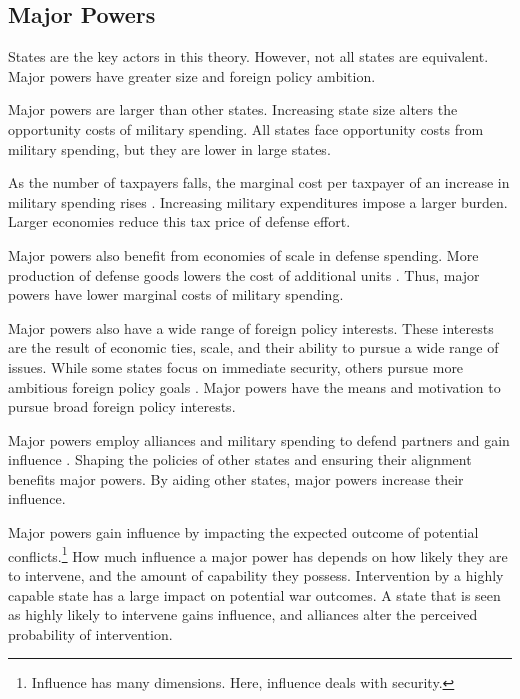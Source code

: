\documentclass[12pt]{article}
\begin{document}
\subsection{Major Powers}

States are the key actors in this theory. 
However, not all states are equivalent.
Major powers have greater size and foreign policy ambition. 


Major powers are larger than other states. 
Increasing state size alters the opportunity costs of military spending.  
All states face opportunity costs from military spending, but they are lower in large states.  


As the number of taxpayers falls, the marginal cost per taxpayer of an increase in military spending rises \citep{DudleyMontmarquette1981}. 
Increasing military expenditures impose a larger burden.
Larger economies reduce this tax price of defense effort. 


Major powers also benefit from economies of scale in defense spending. 
More production of defense goods lowers the cost of additional units \citep{Moravcsik1991, AlesinaSpolaore2006}. 
Thus, major powers have lower marginal costs of military spending.  


Major powers also have a wide range of foreign policy interests.
These interests are the result of economic ties, scale, and their ability to pursue a wide range of issues. 
While some states focus on immediate security, others pursue more ambitious foreign policy goals \citep{Fordham2011, MarkowitzFariss2017}. 
Major powers have the means and motivation to pursue broad foreign policy interests.  


Major powers employ alliances and military spending to defend partners and gain influence \citep{Morrow1991}. 
Shaping the policies of other states and ensuring their alignment benefits major powers. 
By aiding other states, major powers increase their influence. 


Major powers gain influence by impacting the expected outcome of potential conflicts.\footnote{Influence has many dimensions. Here, influence deals with security.} 
How much influence a major power has depends on how likely they are to intervene, and the amount of capability they possess. 
Intervention by a highly capable state has a large impact on potential war outcomes. 
A state that is seen as highly likely to intervene gains influence, and alliances alter the perceived probability of intervention. 
\end{document}
